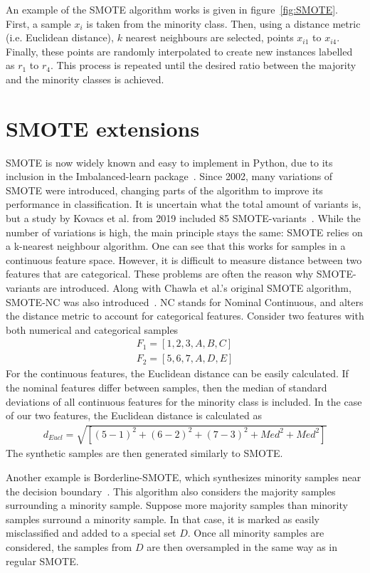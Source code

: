 An example of the SMOTE algorithm works is given in figure~\ref{fig:SMOTE}. First, a sample $x_i$ is taken from the minority class. Then, using a distance metric (i.e. Euclidean distance), $k$ nearest neighbours are selected, points $x_{i1}$ to $x_{i4}$. Finally, these points are randomly interpolated to create new instances labelled as $r_1$ to $r_4$. This process is repeated until the desired ratio between the majority and the minority classes is achieved. 

\section{SMOTE extensions}
SMOTE is now widely known and easy to implement in Python, due to its inclusion in the Imbalanced-learn package~\cite{Lemaitre2017Imbalanced-learn:Learning}. Since 2002, many variations of SMOTE were introduced, changing parts of the algorithm to improve its performance in classification. It is uncertain what the total amount of variants is, but a study by Kovacs et al. from 2019 included 85 SMOTE-variants~\cite{Kovacs2019AnDatasets}. While the number of variations is high, the main principle stays the same: SMOTE relies on a k-nearest neighbour algorithm. One can see that this works for samples in a continuous feature space. However, it is difficult to measure distance between two features that are categorical. These problems are often the reason why SMOTE-variants are introduced. Along with Chawla et al.'s original SMOTE algorithm, SMOTE-NC was also introduced~\cite{Chawla2002SMOTE:Technique}. NC stands for Nominal Continuous, and alters the distance metric to account for categorical features. Consider two features with both numerical and categorical samples
\begin{align}
    F_1 = [1,2,3,A,B,C]  \\
    F_2 = [5,6,7,A,D,E]
\end{align}
For the continuous features, the Euclidean distance can be easily calculated. If the nominal features differ between samples, then the median of standard deviations of all continuous features for the minority class is included. In the case of our two features, the Euclidean distance is calculated as
\begin{align}
    d_{Eucl} = \sqrt{[(5-1)^2 + (6-2)^2 + (7-3)^2 + Med^2 + Med^2]}
\end{align}
The synthetic samples are then generated similarly to SMOTE.

Another example is Borderline-SMOTE, which synthesizes minority samples near the decision boundary~\cite{Han2005Borderline-SMOTE:Learning}. This algorithm also considers the majority samples surrounding a minority sample. Suppose more majority samples than minority samples surround a minority sample. In that case, it is marked as easily misclassified and added to a special set $D$. Once all minority samples are considered, the samples from $D$ are then oversampled in the same way as in regular SMOTE.

